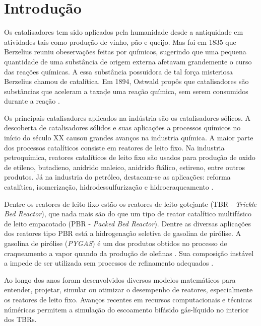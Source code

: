 %
% 
%
\chapter{Introdução} \label{chap:introducao}

Os catalisadores tem sido aplicados pela humanidade desde a antiquidade
em atividades tais como produção de vinho, pão e queijo. Mas foi em 1835 que
Berzelius reuniu obeservações feitas por químicos, sugerindo que uma pequena
quantidade de uma substância de origem externa afetavam grandemente o curso das
reações químicas. A essa substância possuidora de tal força misteriosa Berzelius
chamou de catalítica. Em 1894, Ostwald propôs que catalisadores são
substâncias que aceleram a taxa\d de uma reação química, sem serem consumidos
durante a reação \cite{Oyama1988}.

Os principais catalisadores aplicados na indústria são os catalisadores
sólicos. A descoberta de catalisadores sólidos e suas aplicações a processos
químicos no início do século XX causou grandes avanços na industria química. A
maior parte dos processos catalíticos consiste em reatores de leito fixo. Na
industria petroquímica, reatores catalíticos de leito fixo são usados para
produção de oxido de etileno, butadieno, anidrido maleico, anidrido ftálico,
estireno, entre outros produtos. Já na industria do petróleo, destacam-se as
aplicações: reforma catalítica, isomerização, hidrodessulfurização e
hidrocraqueamento \cite{Froment2011}.

Dentre os reatores de leito fixo estão os reatores de leito gotejante
(TBR - \emph{Trickle Bed Reactor}), que nada mais são do que um tipo de reator
catalítico multifásico de leito empacotado (PBR - \emph{Packed Bed Reactor}).
Dentre as diversas aplicações dos reatores tipo PBR está a hidrogenação
seletiva de gasolina de pirólise. A gasolina de pirólise (\emph{PYGAS}) é um dos
produtos obtidos no processo de craqueamento a vapor quando da produção de
olefinas \cite{Cheng1986}. Sua composição instável a impede de ser utilizada sem
processos de refinamento adequados \cite{Derrien1986}.

Ao longo dos anos foram desenvolvidos diversos modelos matemáticos para
entender, projetar, simular ou otimizar o desempenho de reatores, especialmente
os reatores de leito fixo. Avanços recentes em recursos computacionais e
técnicas núméricas permitem a simulação do escoamento bifásido gás-líquido no
interior dos TBRs\cite{Ranade2011}.

